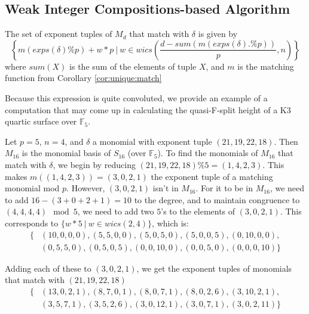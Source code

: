 \subsection{Weak Integer Compositions-based Algorithm}

\begin{lem}
    \label{lem:generate:matching}
    The set of exponent tuples of \(M_{d}\) that match with $\delta$ is given by 
    \[
        \left\{ m(exps(\delta) \% p) + w *p ~\Big|~ w \in wics \left(\frac{d - sum(m(exps(\delta) .\% p))}{p}, n \right) \right\}
    \]
    where $sum(X)$ is the sum of the elements of tuple $X$, and $m$ is the matching function from Corollary \ref{cor:unique:match}
\end{lem}

Because this expression is quite convoluted, we provide an example of a computation 
that may come up in calculating the quasi-F-split height of a K3 quartic surface over $\mathbb{F}_5$.

\begin{ex}
    Let $p = 5$, \(n = 4\), and $\delta$ a monomial with exponent tuple $(21, 19, 22, 18)$. 
    Then $M_16$ is the monomial basis of \(S_{16}\) (over $\mathbb{F}_5$). 
    To find the monomials of $M_{16}$ that match with $\delta$, we begin by reducing $(21, 19, 22, 18) \% 5 = (1, 4, 2, 3)$.
    This makes $m((1, 4, 2, 3)) = (3, 0, 2, 1)$ the exponent tuple of a matching monomial mod \(p\).
    However, \((3, 0, 2, 1)\) isn't in $M_16$. 
    For it to be in $M_16$, we need to add $16 - (3 + 0 + 2 + 1) = 10$ to the degree, and to maintain congruence to $(4, 4, 4, 4) \mod 5$, we need to add two $5$'s to the elements of $(3, 0, 2, 1)$. This corresponds to $\{w * 5 ~|~ w \in wics(2, 4)\}$, which is:
    \begin{align*}
        \{&(10, 0, 0, 0), (5, 5, 0, 0), (5, 0, 5, 0), (5, 0, 0, 5), (0, 10, 0, 0), \\
        &(0, 5, 5, 0), (0, 5, 0, 5), (0, 0, 10, 0), (0, 0, 5, 0), (0, 0, 0, 10)\}
    \end{align*}
        
    \noindent Adding each of these to $(3, 0, 2, 1)$, we get the exponent tuples of monomials that match with $(21, 19, 22, 18)$
    \begin{align*}
        \{&(13, 0, 2, 1), (8, 7, 0, 1), (8, 0, 7, 1), (8, 0, 2, 6), (3, 10, 2, 1), \\
        &(3, 5, 7, 1), (3, 5, 2, 6), (3, 0, 12, 1), (3, 0, 7, 1), (3, 0, 2, 11)\}
    \end{align*}    
\end{ex}

